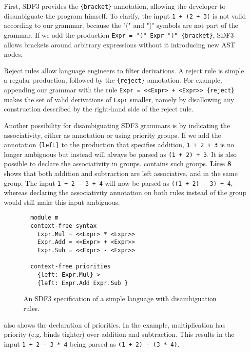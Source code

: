         First, SDF3 provides the \texttt{\{bracket\}} annotation, allowing the developer to disambiguate the program himself. To clarify, the input \texttt{1 + (2 + 3)} is not valid according to our grammar, because the "(" and ")" symbols are not part of the grammar. If we add the production \texttt{Expr = "(" Expr ")" \{bracket\}}, SDF3 allows brackets around arbitrary expressions without it introducing new AST nodes.

        Reject rules allow language engineers to filter derivations. A reject rule is simple a regular production, followed by the \texttt{\{reject\}} annotation. For example, appending our grammar with the rule \texttt{Expr = <<Expr> + <Expr>> \{reject\}} makes the set of valid derivations of \texttt{Expr} smaller, namely by disallowing any construction described by the right-hand side of the reject rule.

        Another possibility for disambiguating SDF3 grammars is by indicating the associativity, either as annotation or using priority groups. If we add the annotation \texttt{\{left\}} to the production that specifies addition, \texttt{1 + 2 + 3} is no longer ambiguous but instead will always be parsed as \texttt{(1 + 2) + 3}. It is also possible to declare the associativity in groups.  contains such groups. \textbf{Line 8} shows that both addition and subtraction are left associative, and in the same group. The input \texttt{1 + 2 - 3 + 4} will now be parsed as \texttt{((1 + 2) - 3) + 4}, whereas declaring the associativity annotation on both rules instead of the group would still make this input ambiguous.

        \begin{figure}
          \begin{verbatim}
  module m
  context-free syntax
    Expr.Mul = <<Expr> * <Expr>>
    Expr.Add = <<Expr> + <Expr>>
    Expr.Sub = <<Expr> - <Expr>>

  context-free priorities
    {left: Expr.Mul} >
    {left: Expr.Add Expr.Sub }
          \end{verbatim}
          \caption{\label{fig:sdf3-syntax-disambiguation}An SDF3 specification of a simple language with disambiguation rules.}
        \end{figure}

         also shows the declaration of priorities. In the example, multiplication has priority (e.g. binds tighter) over addition and subtraction. This results in the input \texttt{1 + 2 - 3 * 4} being parsed as \texttt{(1 + 2) - (3 * 4)}.

